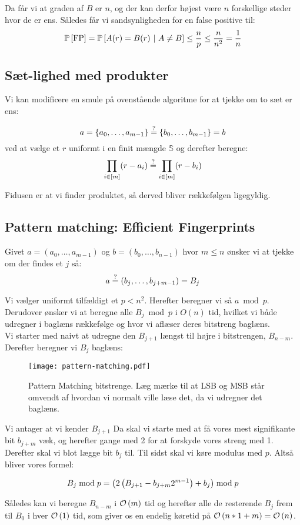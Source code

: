 Da får vi at graden af $B$ er $n$, og der kan derfor højest være $n$ forskellige steder hvor de er ens. Således får vi sandsynligheden for en false positive til:
$$
  \P{\text{FP}}
  = \P{A(r) = B(r) \ | A \neq B}
  \leq \frac{n}{p}
  \leq \frac{n}{n^2}
  = \frac{1}{n}
$$

\subsection{Sæt-lighed med produkter}
Vi kan modificere en smule på ovenstående algoritme for at tjekke om to sæt er ens:

$$
  a = \{a_0, \dots, a_{m-1} \}
  \stackrel{?}{=}
  \{b_0, \dots, b_{m-1} \} = b
$$
ved at vælge et $r$ uniformt i en finit mængde $\mathbb S$ og derefter beregne:
$$
  \prod_{i \in [m]} (r - a_i) \stackrel{?}{=}
  \prod_{i \in [m]} (r - b_i)
$$

Fidusen er at vi finder produktet, så derved bliver rækkefølgen ligegyldig.


\subsection{Pattern matching: Efficient Fingerprints}
Givet $a = (a_0, \dots, a_{m-1})$ og $b = (b_0, \dots, b_{n-1})$ hvor $m \leq n$ ønsker vi at tjekke om der findes et $j$ så:
$$
  a \stackrel{?}{=} (b_j, \dots, b_{j+m-1}) = B_j
$$

Vi vælger uniformt tilfældigt et $p < n^2$. Herefter beregner vi så $a \bmod p$. Derudover ønsker vi at beregne alle $B_j \bmod p$ i $O(n)$ tid, hvilket vi både udregner i baglæns rækkefølge og hvor vi aflæser deres bitstreng baglæns.\\

Vi starter med naivt at udregne den $B_{j+1}$ længst til højre i bitstrengen, $B_{n-m}$. Derefter beregner vi $B_j$ baglæns:

\begin{figure}[H]
  \begin{center}
  \texttt{[image: pattern-matching.pdf]}
  \end{center}
  \caption{Pattern Matching bitstrenge. Læg mærke til at LSB og MSB står omvendt af hvordan vi normalt ville læse det, da vi udregner det baglæns.}
  \label{fig:pattern}
\end{figure}

Vi antager at vi kender $B_{j+1}$ Da skal vi starte med at få vores mest signifikante bit $b_{j+m}$ væk, og herefter gange med 2 for at forskyde vores streng med 1. Derefter skal vi blot lægge bit $b_j$ til. Til sidst skal vi køre modulus med $p$. Altså bliver vores formel:

$$
  B_{j} \bmod p
  = \left( 2 \left(  B_{j+1} - b_{j+m} 2^{m-1}  \right) + b_j \right) \bmod p
$$

Således kan vi beregne $B_{n-m}$ i $\mathcal{O} \left(  m  \right)$ tid og herefter alle de resterende $B_j$ frem til $B_0$ i hver $\mathcal{O} \left(  1  \right)$ tid, som giver os en endelig køretid på $\mathcal{O} \left(  n*1 + m  \right) = \mathcal{O} \left(  n  \right)$.




